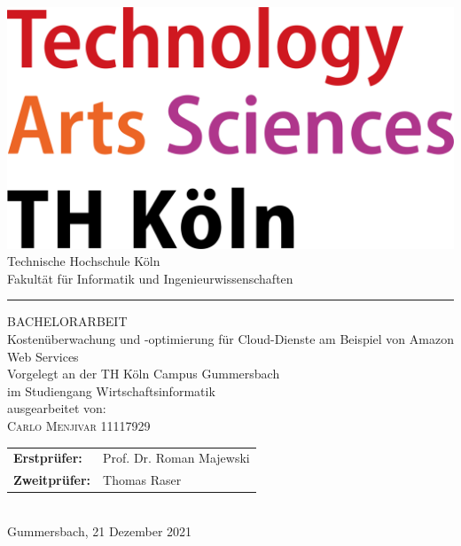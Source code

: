 \documentclass[a4paper,12pt,oneside]{article}
\begin{document}
\pagestyle{empty} %
\newpage %

\newpage
\pagestyle{empty}
\begin{titlepage}
  \begin{center}\includegraphics[scale=0.18]{sources/TH_Koeln_Logo}\\
    \Large
    Technische Hochschule Köln\\
    Fakultät für Informatik und Ingenieurwissenschaften\\
    \hrule\par\rule{0pt}{2cm} %
    \LARGE
    \textsc{BACHELORARBEIT}\\
    \vspace{0.8cm} %
    \huge
    Kostenüberwachung und -optimierung für Cloud-Dienste am Beispiel von Amazon Web Services \\    
    \vspace{0.8cm}
    \large
    Vorgelegt an der TH Köln Campus Gummersbach\\
    im Studiengang Wirtschaftsinformatik\\
    \vspace{0.8cm}
    ausgearbeitet von:\\
    \textsc{Carlo Menjivar} 11117929\\
    \vspace{0.8cm}
    \begin{tabular}{ll} %
      \textbf{Erstprüfer:}  & Prof. Dr. Roman Majewski \\
      \textbf{Zweitprüfer:} & Thomas Raser\\
    \end{tabular}
    \vspace{0.8cm}
    \\Gummersbach, 21 Dezember 2021
  \end{center}
\end{titlepage}
\newpage
\end{document}
